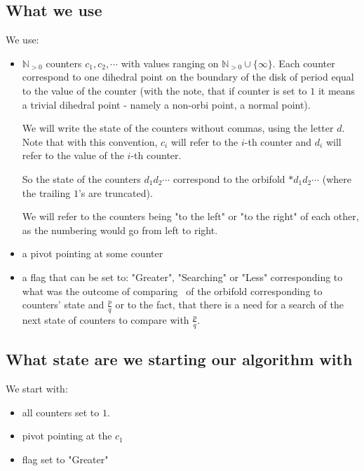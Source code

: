 \subsection{What we use}
We use: 
\begin{itemize}
\item $\mathbb{N}_{>0}$ counters $c_1, c_2, \cdots$ 
with values ranging on $\mathbb{N}_{>0}\cup\{\infty\}$.
Each counter correspond to one dihedral point 
on the boundary of the disk of period equal to the value of the counter (with the note, that 
if counter is set to $1$ it means a trivial dihedral point - namely a non-orbi point, 
a normal point). 

We will write the state of the counters without commas, using the letter $d$. 
Note that with this convention, $c_i$ will refer to the $i$-th counter and $d_i$ will 
refer to the value of the $i$-th counter. 

So the state of the counters $d_1d_2\cdots$ correspond to the orbifold 
$*d_1d_2\cdots$ (where the trailing $1$'s are truncated).

We will refer to the counters being "to the left" or "to the right" of each other, as 
the numbering would go from left to right.

\item a pivot pointing at some counter 
\item a flag that can be set to: "Greater", "Searching" or "Less" corresponding to what was 
the outcome of comparing \Eoc\ of the orbifold corresponding to counters' state and 
$\frac{p}{q}$ or to the fact, that there is a need for a search of the next state of counters 
to compare with $\frac{p}{q}$.  
\end{itemize}
\subsection{What state are we starting our algorithm with}
We start with:
\begin{itemize}
\item all counters set to $1$. 
\item pivot pointing at the $c_1$
\item flag set to "Greater"
\end{itemize}
